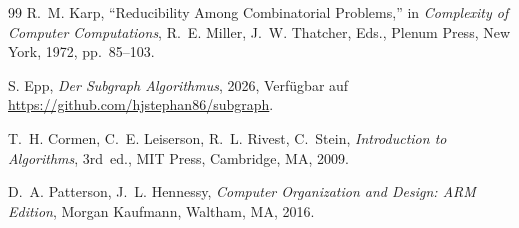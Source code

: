 ﻿\documentclass[12pt, a4paper]{article}
\theoremstyle{plain}
\theoremstyle{definition}
\theoremstyle{remark}
\begin{document}
\begin{thebibliography}{99}
R.~M. Karp,
``Reducibility Among Combinatorial Problems,''
in \textit{Complexity of Computer Computations}, R.~E. Miller, J.~W. Thatcher, Eds.,
Plenum Press, New York, 1972, pp.~85--103.

S. Epp,
\textit{Der Subgraph Algorithmus}, 2026, Verfügbar auf \url{https://github.com/hjstephan86/subgraph}.

T.~H. Cormen, C.~E. Leiserson, R.~L. Rivest, C.~Stein,
\textit{Introduction to Algorithms}, 3rd~ed.,
MIT Press, Cambridge, MA, 2009.

D.~A. Patterson, J.~L. Hennessy,
\textit{Computer Organization and Design: ARM Edition},
Morgan Kaufmann, Waltham, MA, 2016.

\end{thebibliography}
\end{document}
